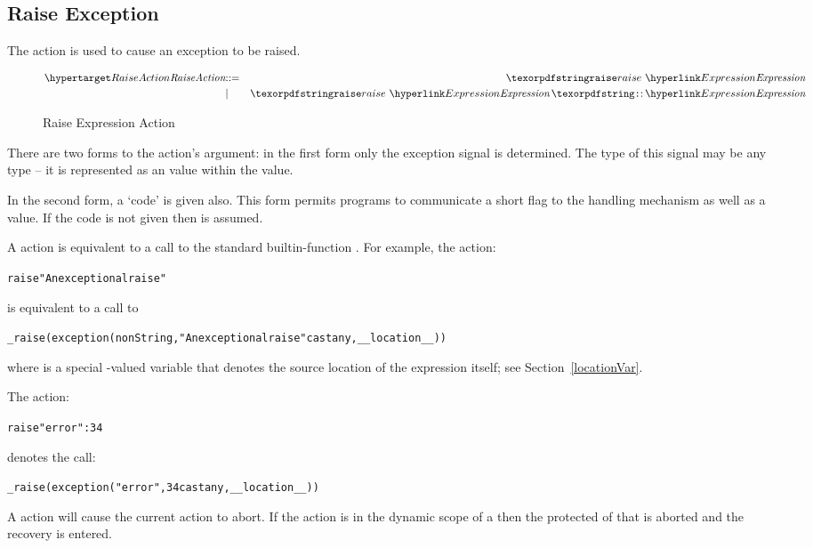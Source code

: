 \subsection{Raise Exception}
\label{raiseAction}
The  action is used to cause an exception to be raised.

\begin{figure}[htbp]
\begin{eqnarray*}
\ntDef{RaiseAction}&\arrow&\q{raise}\ \ntRef{Expression}\\
&\choice&\q{raise}\ \ntRef{Expression}\,\q{:}\,\ntRef{Expression}
\end{eqnarray*}
\caption{Raise Expression Action}
\label{raiseActionFig}
\end{figure}
There are two forms to the  action's argument: in the first form only the  exception signal is determined. The type of this signal may be any type -- it is represented as an  value within the  value.

In the second form, a  `code' is given also. This form permits programs to communicate a short flag to the handling mechanism as well as a value. If the code is not given then  is assumed.

A  action is equivalent to a call to the standard builtin-function . For example, the  action:
\begin{alltt}
raise "An exceptional raise"
\end{alltt}
is equivalent to a call to 
\begin{alltt}
_raise(exception(nonString,"An exceptional raise" cast any,__location__))
\end{alltt}
where  is a special -valued variable that denotes the source location of the expression itself; see Section~\vref{locationVar}.

The action:
\begin{alltt}
raise "error":34
\end{alltt}
denotes the call:
\begin{alltt}
_raise(exception("error",34 cast any,__location__))
\end{alltt}

A  action will cause the current action to abort. If the  action is in the dynamic scope of a  then the protected  of that  is aborted and the recovery  is entered.

